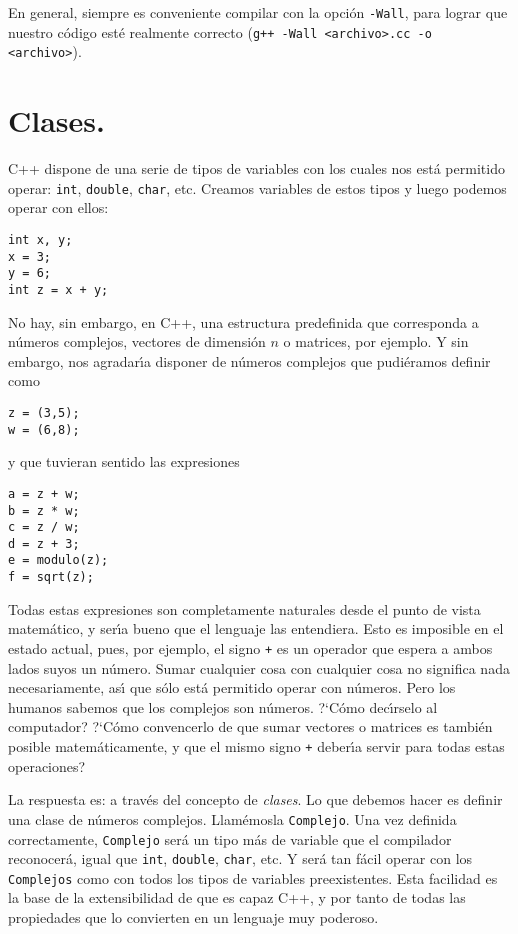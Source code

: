 En general, siempre es conveniente compilar con la opci\'on
\verb+-Wall+, para lograr
que nuestro c\'odigo est\'e realmente correcto 
(\verb|g++ -Wall <archivo>.cc -o <archivo>|).

\section{Clases.}

C++ dispone de una serie de tipos de variables con los cuales nos
est{\'a} permitido  operar: \verb+int+, \verb+double+, \verb+char+, etc.
Creamos variables de estos tipos y luego podemos operar con ellos:

\begin{verbatim}
int x, y;
x = 3;
y = 6;
int z = x + y;
\end{verbatim}

No hay, sin embargo, en C++, una estructura predefinida que
corresponda a n{\'u}meros complejos, vectores de dimensi{\'o}n $n$ o
matrices, por ejemplo. Y sin embargo, nos agradar\'{\i}a disponer de
n{\'u}meros complejos que pudi{\'e}ramos definir como 
\begin{verbatim}
z = (3,5);
w = (6,8);
\end{verbatim}
y que tuvieran sentido las expresiones
\begin{verbatim}
a = z + w;
b = z * w;
c = z / w;
d = z + 3;
e = modulo(z);
f = sqrt(z);
\end{verbatim}

Todas estas expresiones son completamente naturales desde el punto de
vista matem{\'a}tico, y ser\'{\i}a bueno que el lenguaje las
entendiera. Esto es imposible en el estado actual, pues, por ejemplo,
el signo \verb-+- es un operador que espera a ambos lados suyos un
n{\'u}mero. Sumar cualquier cosa con cualquier cosa no significa nada
necesariamente, as\'{\i} que s{\'o}lo est{\'a} permitido operar con
n{\'u}meros. Pero los humanos sabemos que los complejos son n{\'u}meros.
?`C{\'o}mo dec\'{\i}rselo al computador? ?`C{\'o}mo convencerlo de que
sumar vectores o matrices es tambi{\'e}n posible matem{\'a}ticamente, y
que el mismo signo \verb-+- deber\'{\i}a servir para todas estas
operaciones?

La respuesta es: a trav{\'e}s del concepto de {\em clases\/}. Lo que
debemos hacer es definir una clase de n{\'u}meros complejos.
Llam{\'e}mosla \verb+Complejo+. Una vez definida correctamente,
\verb+Complejo+ ser{\'a} un tipo m{\'a}s de variable que el compilador
reconocer{\'a}, igual que \verb+int+, \verb+double+, \verb+char+, etc.
Y ser{\'a} tan f{\'a}cil operar con los \verb+Complejos+ como con todos
los tipos de variables preexistentes. Esta facilidad es la base de
la extensibilidad de que es capaz  C++, y por tanto de todas las
propiedades que lo convierten en un lenguaje muy poderoso. 

